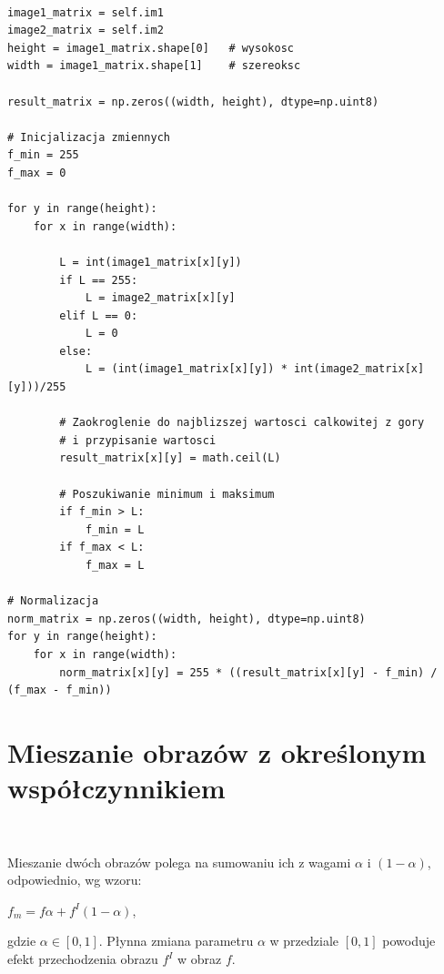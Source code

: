 \documentclass[final,a4paper,openany,12pt]{mwbk}
\begin{document}
\begin{lstlisting}[caption=Mnożenie obrazu szarego przez inny obraz ]

image1_matrix = self.im1
image2_matrix = self.im2
height = image1_matrix.shape[0]   # wysokosc
width = image1_matrix.shape[1]    # szereoksc

result_matrix = np.zeros((width, height), dtype=np.uint8)

# Inicjalizacja zmiennych
f_min = 255
f_max = 0

for y in range(height):
    for x in range(width):  

        L = int(image1_matrix[x][y]) 
        if L == 255:
            L = image2_matrix[x][y]
        elif L == 0:
            L = 0
        else:
            L = (int(image1_matrix[x][y]) * int(image2_matrix[x][y]))/255 

        # Zaokroglenie do najblizszej wartosci calkowitej z gory
        # i przypisanie wartosci
        result_matrix[x][y] = math.ceil(L)
                        
        # Poszukiwanie minimum i maksimum
        if f_min > L:
            f_min = L
        if f_max < L:
            f_max = L

# Normalizacja
norm_matrix = np.zeros((width, height), dtype=np.uint8)
for y in range(height):
    for x in range(width):
        norm_matrix[x][y] = 255 * ((result_matrix[x][y] - f_min) / (f_max - f_min))

\end{lstlisting}
\newpage

\section {Mieszanie obrazów z określonym współczynnikiem}
\hfill\\
\indent
\vspace{5mm}

Mieszanie dwóch obrazów polega na sumowaniu ich z wagami $\alpha$ i $(1 - \alpha)$, odpowiednio, wg wzoru:
	
	\begin{center}
		$f_{m} = f\alpha + f^I(1 - \alpha)$,
	\end{center}
	gdzie $\alpha \in [0,1]$. Płynna zmiana parametru $\alpha$ w przedziale $[0,1]$ powoduje efekt przechodzenia obrazu $f^I$ w obraz $f$. 
	
\end{document}
